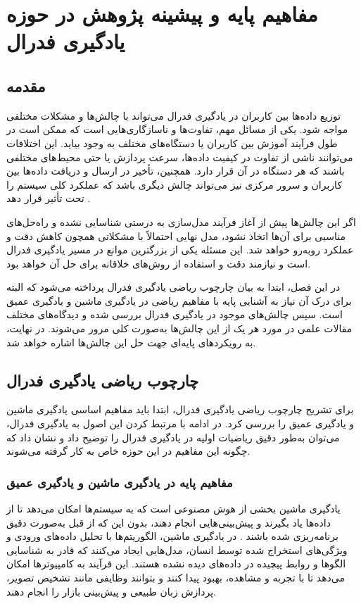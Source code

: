 \chapter{
	مفاهیم پایه و پیشینه پژوهش در حوزه یادگیری فدرال
}


\section{مقدمه}
توزیع داده‌ها بین کاربران در یادگیری فدرال می‌تواند با چالش‌ها و مشکلات مختلفی مواجه شود. یکی از مسائل مهم، تفاوت‌ها و ناسازگاری‌هایی است که ممکن است در طول فرآیند آموزش بین کاربران یا دستگاه‌های مختلف به وجود بیاید. این اختلافات می‌توانند ناشی از تفاوت در کیفیت داده‌ها، سرعت پردازش یا حتی محیط‌های مختلفی باشند که هر دستگاه در آن قرار دارد. همچنین، تأخیر در ارسال و دریافت داده‌ها بین کاربران و سرور مرکزی نیز می‌تواند چالش دیگری باشد که عملکرد کلی سیستم را تحت تأثیر قرار دهد
\cite{li2020federated}.

اگر این چالش‌ها پیش از آغاز فرآیند مدل‌سازی به درستی شناسایی نشده و راه‌حل‌های مناسبی برای آن‌ها اتخاذ نشود، مدل نهایی احتمالاً با مشکلاتی همچون کاهش دقت و عملکرد روبه‌رو خواهد شد. این مسئله یکی از بزرگترین موانع در مسیر یادگیری فدرال است و نیازمند دقت و استفاده از روش‌های خلاقانه برای حل آن خواهد بود.

در این فصل، ابتدا به بیان چارچوب ریاضی یادگیری فدرال پرداخته می‌شود که البته برای درک آن نیاز به آشنایی پایه با مفاهیم ریاضی در یادگیری ماشین و یادگیری عمیق است. سپس چالش‌های موجود در یادگیری فدرال بررسی شده و دیدگاه‌های مختلف مقالات علمی در مورد هر یک از این چالش‌ها به‌صورت کلی مرور می‌شوند. در نهایت، به رویکردهای پایه‌ای جهت حل این چالش‌ها اشاره خواهد شد.


\section{چارچوب ریاضی یادگیری فدرال}
برای تشریح چارچوب ریاضی یادگیری فدرال، ابتدا باید مفاهیم اساسی یادگیری ماشین و یادگیری عمیق را بررسی کرد. در ادامه با مرتبط کردن این اصول به یادگیری فدرال، می‌توان به‌طور دقیق ریاضیات اولیه در یادگیری فدرال را توضیح داد و نشان داد که چگونه این مفاهیم در این حوزه خاص به کار گرفته می‌شوند.

\subsection{مفاهیم پایه در یادگیری ماشین و یادگیری عمیق}
یادگیری ماشین بخشی از هوش مصنوعی است که به سیستم‌ها امکان می‌دهد تا از داده‌ها یاد بگیرند و پیش‌بینی‌هایی انجام دهند، بدون این که از قبل به‌صورت دقیق برنامه‌ریزی شده باشند
\cite{gavrilova2020artificial}.
در یادگیری ماشین، الگوریتم‌ها با تحلیل داده‌های ورودی و ویژگی‌های استخراج شده توسط انسان، مدل‌هایی ایجاد می‌کنند که قادر به شناسایی الگوها و روابط پیچیده در داده‌های دیده نشده هستند. این فرآیند به کامپیوترها امکان می‌دهد تا با تجربه و مشاهده، بهبود پیدا کنند و بتوانند وظایفی مانند تشخیص تصویر، پردازش زبان طبیعی و پیش‌بینی بازار را انجام دهند.

